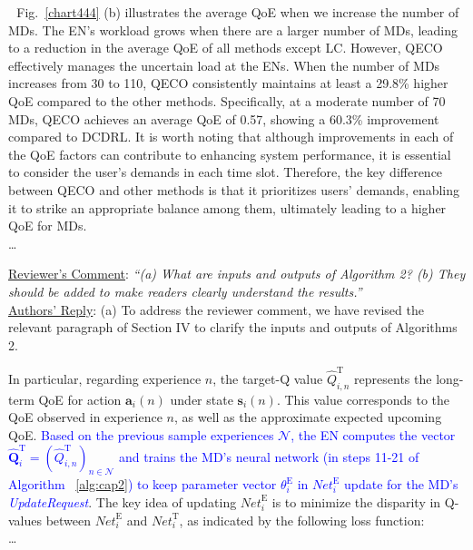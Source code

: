 \documentclass[12pt,draftclsnofoot,onecolumn]{IEEEtran}
\newcommand{\rev}[1]{{\color{blue}#1}} %
\newcommand{\rev}[1]{#1}
\newenvironment{my}[2]%
{\begin{list}{}%
{\setlength{\rightmargin}{#1}\setlength{\leftmargin}{#2}}%


 \item[]{}

} {\end{list}}
\begin{document}
\begin{enumerate}
\begin{my}{1cm}{1cm}
{{			\,\,\,\,Fig.~\ref{chart444} (b) illustrates the average QoE when we increase the number of MDs. The EN's workload grows when there are a larger number of MDs, leading to a reduction in the average QoE of all methods except LC. However, QECO effectively manages the uncertain load at the ENs. When the number of MDs increases from 30 to 110, QECO consistently maintains at least a 29.8\% higher QoE compared to the other methods. Specifically, at a moderate number of 70 MDs, QECO achieves an average QoE of 0.57, showing a 60.3\% improvement compared to DCDRL. It is worth noting that although improvements in each of the QoE factors can contribute to enhancing system performance, it is essential to consider the user's demands in each time slot. Therefore, the key difference between QECO and other methods is that it prioritizes users' demands, enabling it to strike an appropriate balance among them, ultimately leading to a higher QoE for MDs. \vspace{3mm}\\\dots }}
	
\end{my}\vspace{6mm}
	


	\item \underline{Reviewer's Comment}: 
	\textit{``(a) What are inputs and outputs of Algorithm 2? (b) They should be added to make readers clearly understand the results.''} \\\newline
	\underline{Authors' Reply}: (a) To address the reviewer comment, we have revised the relevant paragraph of Section IV to clarify the inputs and outputs of Algorithms 2.\newline
	
	\begin{my}{1cm}{1cm}
		\rev{In particular, regarding experience $n$, the target-Q value $\hat{Q}_{i,n}^{\text{T}}$ represents the long-term QoE for action $\boldsymbol{a}_i(n)$ under state $\boldsymbol{s}_i(n)$. This value corresponds to the QoE observed in experience $n$, as well as the approximate expected upcoming QoE. 
			\textcolor{blue}{Based on the previous sample experiences $\mathcal{N}$, the EN computes the vector $\hat{\mathbf{Q}}_i^{\text{T}} = (\hat{Q}^{\text{T}}_{i,n})_{n \in \mathcal{N}}$ and trains the MD's neural network (in steps 11-21 of Algorithm ~\ref{alg:cap2}) to keep parameter vector $\theta^{\text{E}}_i$ in $\textit{Net}_i^{\text{E}}$ update for the MD's \textit{UpdateRequest}}. The key idea of updating $\textit{Net}_i^{\text{E}}$ is to minimize the disparity in Q-values between $\textit{Net}_i^{\text{E}}$ and $\textit{Net}_i^{\text{T}}$, as indicated by the following loss function:\\ \dots}
	\end{my}
		

\end{enumerate}
\end{document}
